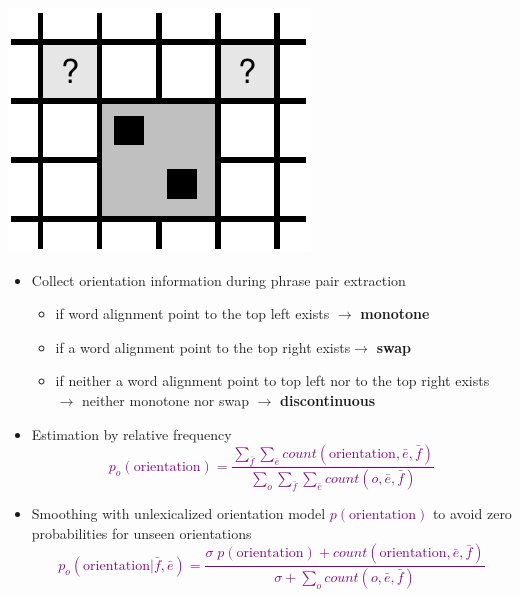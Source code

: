 \documentclass[landscape]{slides}
\newcommand{\maths}[1]{\textcolor{purple}{#1}}
\begin{document}

\begin{center}
\includegraphics[scale=1.2]{lexicalized-reordering-training.pdf}
\end{center}
\begin{itemize}
\item Collect orientation information during phrase pair extraction 
\begin{itemize}\itemsep 3mm
\item if word alignment point to the top left exists $\rightarrow$ {\bf monotone}
\item if a word alignment point to the top right exists$\rightarrow$ {\bf swap}
\item if neither a word alignment point to top left nor to the top right exists\\ $\rightarrow$  neither monotone nor swap $\rightarrow$ {\bf discontinuous}
\end{itemize}
\end{itemize}


\begin{itemize}
\item Estimation by relative frequency
\maths{\begin{equation*}
p_o(\mbox{orientation}) = \frac{\sum_{\bar{f}} \sum_{\bar{e}} count(\mbox{orientation},\bar{e},\bar{f})}{\sum_o \sum_{\bar{f}} \sum_{\bar{e}} count(o,\bar{e},\bar{f})}
\end{equation*}}
\item Smoothing with unlexicalized orientation model \maths{$p(\mbox{orientation})$} to avoid zero probabilities for unseen orientations
\maths{\begin{equation*}
p_o(\mbox{orientation}|\bar{f},\bar{e}) = \frac{\sigma \; p(\mbox{orientation}) + count(\mbox{orientation},\bar{e},\bar{f})}{\sigma + \sum_o count(o,\bar{e},\bar{f})}
\end{equation*}}
\end{itemize}
\end{document}
